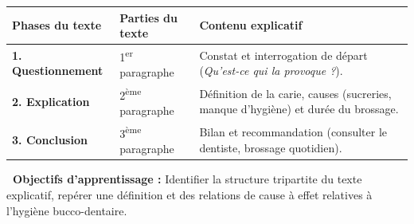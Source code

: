 \documentclass[a4paper,10pt]{article}
\begin{document}
\begin{tcolorbox}[
  enhanced,
  colback=white,
  colframe=cardborder,
  arc=2mm,boxrule=0.7pt,
  top=4pt,bottom=4pt,left=7pt,right=7pt,
  title={\small\textbf{\textcolor{primary}{\faTable\ Tableau de structuration du texte explicatif}}},
  coltitle=primary,colbacktitle=primarylight,titlerule=0.4pt
]
{\footnotesize
\begin{tabularx}{\linewidth}{|l|X|X|}
\hline
\rowcolor{primarylight}\textbf{Phases du texte} & \textbf{Parties du texte} & \textbf{Contenu explicatif} \\
\hline
\textbf{1. Questionnement} & 1\textsuperscript{er} paragraphe & Constat et interrogation de départ (\textit{Qu'est-ce qui la provoque ?}). \\
\hline
\textbf{2. Explication} & 2\textsuperscript{ème} paragraphe & Définition de la carie, causes (sucreries, manque d'hygiène) et durée du brossage. \\
\hline
\textbf{3. Conclusion} & 3\textsuperscript{ème} paragraphe & Bilan et recommandation (consulter le dentiste, brossage quotidien). \\
\hline
\end{tabularx}
}
\end{tcolorbox}

\vspace{3pt}

\begin{tcolorbox}[
  enhanced,
  colback=secondarylight!50,
  colframe=secondary,
  arc=1.5mm,leftrule=3pt,rightrule=0.5pt,toprule=0.5pt,bottomrule=0.5pt,
  top=3pt,bottom=3pt,left=6pt,right=6pt
]
{\footnotesize
\textbf{\faBullseye\ Objectifs d'apprentissage :} Identifier la structure tripartite du texte explicatif, repérer une définition et des relations de cause à effet relatives à l'hygiène bucco-dentaire.
}
\end{tcolorbox}

\newpage

\ficheEleveHeader

\vspace{-3pt}

\vspace{2pt}
\end{document}
